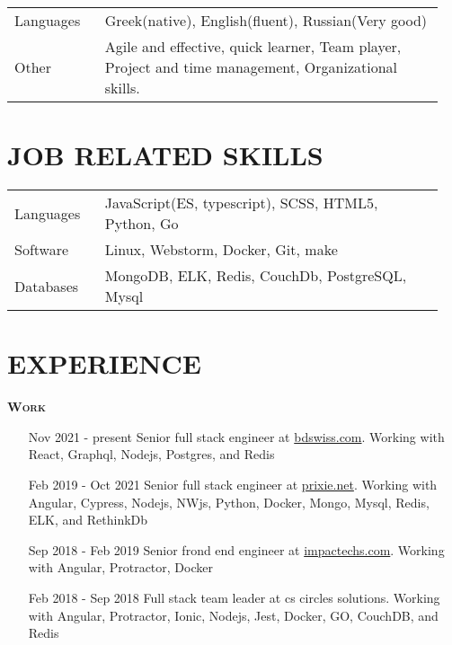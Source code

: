 \documentclass[margin, 11pt]{res} %
\begin{document}
\begin{resume}
        \begin{tabular}{p{0.2\linewidth} p{0.75\linewidth}}

            Languages & Greek(native), English(fluent), Russian(Very good) \\
            Other & Agile and effective, quick learner, Team player, Project and time management, Organizational skills.

        \end{tabular}

        \section{JOB RELATED SKILLS}\label{sec:job-related-skills}

        \begin{tabular}{p{0.2\linewidth} p{0.75\linewidth}}

            Languages & JavaScript(ES, typescript), SCSS, HTML5, Python, Go \\
            Software & Linux, Webstorm, Docker, Git, make \\
            Databases & MongoDB, ELK, Redis, CouchDb, PostgreSQL, Mysql

        \end{tabular}

        \section{EXPERIENCE}\label{sec:experience}

        \textsc{ \textbf{Work}}

        \begin{itemize}
            \item[Nov 2021 - present] Senior full stack engineer at \href{https://bdswiss.com}{bdswiss.com}.
            Working with React, Graphql, Nodejs, Postgres, and Redis

            \item[Feb 2019 - Oct 2021] Senior full stack engineer at \href{http://prixie.net}{prixie.net}.
            Working with Angular, Cypress, Nodejs, NWjs, Python, Docker, Mongo, Mysql, Redis, ELK, and RethinkDb

            \item[Sep 2018 - Feb 2019] Senior frond end engineer at \href{http://impactechs.com}{impactechs.com}.
            Working with Angular, Protractor, Docker

            \item[Feb 2018 - Sep 2018] Full stack team leader at cs circles solutions.
            Working with Angular, Protractor, Ionic, Nodejs, Jest, Docker, GO, CouchDB, and Redis


\end{itemize}
\end{resume}
\end{document}
